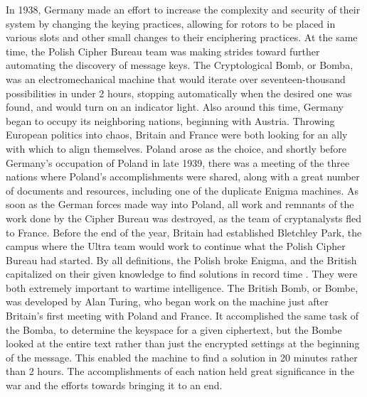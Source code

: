 In 1938, Germany made an effort to increase the complexity and security of their system by changing the keying practices, allowing for rotors to be placed in various slots and other small changes to their enciphering practices. At the same time, the Polish Cipher Bureau team was making strides toward further automating the discovery of message keys. The Cryptological Bomb, or Bomba, was an electromechanical machine that would iterate over seventeen-thousand possibilities in under 2 hours, stopping automatically when the desired one was found, and would turn on an indicator light. Also around this time, Germany began to occupy its neighboring nations, beginning with Austria. Throwing European politics into chaos, Britain and France were both looking for an ally with which to align themselves. Poland arose as the choice, and shortly before Germany’s occupation of Poland in late 1939, there was a meeting of the three nations where Poland’s accomplishments were shared, along with a great number of documents and resources, including one of the duplicate Enigma machines. As soon as the German forces made way into Poland, all work and remnants of the work done by the Cipher Bureau was destroyed, as the team of cryptanalysts fled to France. Before the end of the year, Britain had established Bletchley Park, the campus where the Ultra team would work to continue what the Polish Cipher Bureau had started. By all definitions, the Polish broke Enigma, and the British capitalized on their given knowledge to find solutions in record time \cite{rfc01}. They were both extremely important to wartime intelligence. The British Bomb, or Bombe, was developed by Alan Turing, who began work on the machine just after Britain’s first meeting with Poland and France. It accomplished the same task of the Bomba, to determine the keyspace for a given ciphertext, but the Bombe looked at the entire text rather than just the encrypted settings at the beginning of the message. This enabled the machine to find a solution in 20 minutes rather than 2 hours. The accomplishments of each nation held great significance in the war and the efforts towards bringing it to an end.
